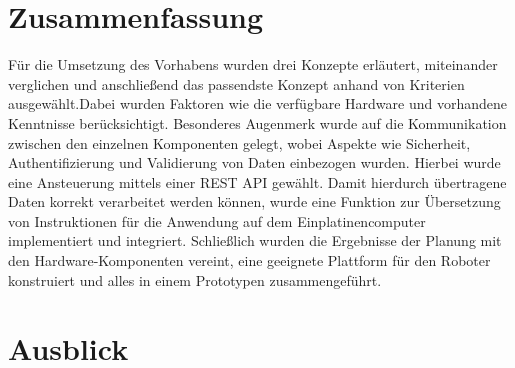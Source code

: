\section{Zusammenfassung}

Für die Umsetzung des Vorhabens wurden drei Konzepte erläutert, miteinander verglichen und anschließend das passendste Konzept anhand von Kriterien ausgewählt.Dabei wurden Faktoren wie die verfügbare Hardware und vorhandene Kenntnisse berücksichtigt. Besonderes Augenmerk wurde auf die Kommunikation zwischen den einzelnen Komponenten gelegt, wobei Aspekte wie Sicherheit, Authentifizierung und Validierung von Daten einbezogen wurden. Hierbei wurde eine Ansteuerung mittels einer REST API gewählt. Damit hierdurch übertragene Daten korrekt verarbeitet werden können, wurde eine Funktion zur Übersetzung von Instruktionen für die Anwendung auf dem Einplatinencomputer implementiert und integriert. Schließlich wurden die Ergebnisse der Planung mit den Hardware-Komponenten vereint, eine geeignete Plattform für den Roboter konstruiert und alles in einem Prototypen zusammengeführt.

\section{Ausblick}
